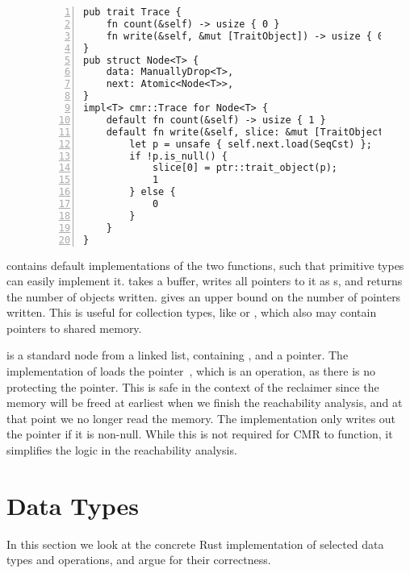 \begin{figure}[t]
  \begin{lstlisting}[caption=Definition of the \code{Trace} trait and a sample implementation for a
  linked list node. The impementation uses \emph{specialization} (Section~\ref{sec:specialization})
  as the implementation of \code{Node}s containing data that itself is \code{Trace} is different.,
  numbers=left,
  numberstyle=\color{gray}\ttfamily{}T,
  ]
pub trait Trace {
    fn count(&self) -> usize { 0 }
    fn write(&self, &mut [TraitObject]) -> usize { 0 }
}
pub struct Node<T> {
    data: ManuallyDrop<T>,
    next: Atomic<Node<T>>,
}
impl<T> cmr::Trace for Node<T> {
    default fn count(&self) -> usize { 1 }
    default fn write(&self, slice: &mut [TraitObject]) -> usize {
        let p = unsafe { self.next.load(SeqCst) };
        if !p.is_null() {
            slice[0] = ptr::trait_object(p);
            1
        } else {
            0
        }
    }
}\end{lstlisting}
\end{figure}

 contains default implementations of the two functions, such that primitive types can
easily implement it.  takes a buffer, writes all pointers to it as s,
and returns the number of objects written.  gives an upper bound on the number of
pointers written. This is useful for collection types, like  or , which
also may contain pointers to shared memory.

 is a standard node from a linked list, containing , and a 
pointer. The implementation of  loads the  pointer~, which is
an  operation, as there is no  protecting the pointer. This is safe in the
context of the reclaimer since the memory will be freed at earliest when we finish the reachability
analysis, and at that point we no longer read the memory. The implementation only writes out the
pointer if it is non-null. While this is not required for CMR to function, it simplifies the logic
in the reachability analysis.


\section{Data Types\label{sec:data-types}}

In this section we look at the concrete Rust implementation of selected data types and operations,
and argue for their correctness.

